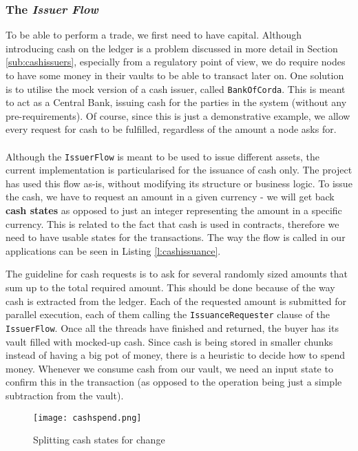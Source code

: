 \documentclass[12pt,twoside]{article}
\begin{document}
\subsubsection{The \textit{Issuer Flow}}
\label{sub:issuerFlow}
To be able to perform a trade, we first need to have capital. Although introducing cash on the ledger is a problem discussed in more detail in Section \ref{sub:cashissuers}, especially from a regulatory point of view, we do require nodes to have some money in their vaults to be able to transact later on. One solution is to utilise the mock version of a cash issuer, called \verb|BankOfCorda|. This is meant to act as a Central Bank, issuing cash for the parties in the system (without any pre-requirements). Of course, since this is just a demonstrative example, we allow every request for cash to be fulfilled, regardless of the amount a node asks for. 
\\ \\
Although the \verb|IssuerFlow| is meant to be used to issue different assets, the current implementation is particularised for the issuance of cash only. The project has used this flow as-is, without modifying its structure or business logic. To issue the cash, we have to request an amount in a given currency - we will get back \textbf{cash states} as opposed to just an integer representing the amount in a specific currency. This is related to the fact that cash is used in contracts, therefore we need to have usable states for the transactions. The way the flow is called in our applications can be seen in Listing \ref{l:cashissuance}.

The guideline for cash requests is to ask for several randomly sized amounts that sum up to the total required amount. This should be done because of the way cash is extracted from the ledger. Each of the requested amount is submitted for parallel execution, each of them calling the \verb|IssuanceRequester| clause of the \verb|IssuerFlow|. Once all the threads have finished and returned, the buyer has its vault filled with mocked-up cash. Since cash is being stored in smaller chunks instead of having a big pot of money, there is a heuristic to decide how to spend money. Whenever we consume cash from our vault, we need an input state to confirm this in the transaction (as opposed to the operation being just a simple subtraction from the vault). 
\\
\begin{figure}[!htb]
\centering
\texttt{[image: cashspend.png]}
\caption{Splitting cash states for change}
\centering
\label{fig:cashspend}
\end{figure}
\end{document}
